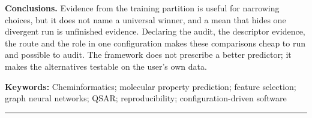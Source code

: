 \documentclass[10pt,a4paper]{article}
\begin{document}
\noindent\textbf{Conclusions.} Evidence from the training partition is useful for narrowing choices, but it does not name a universal winner, and a mean that hides one divergent run is unfinished evidence. Declaring the audit, the descriptor evidence, the route and the role in one configuration makes these comparisons cheap to run and possible to audit. The framework does not prescribe a better predictor; it makes the alternatives testable on the user's own data.

\vspace{6pt}
\noindent\textbf{Keywords:} Cheminformatics; molecular property prediction; feature selection; graph neural networks; QSAR; reproducibility; configuration-driven software

\vspace{4pt}
\hrule
\vspace{4pt}

\linenumbers








\end{document}
